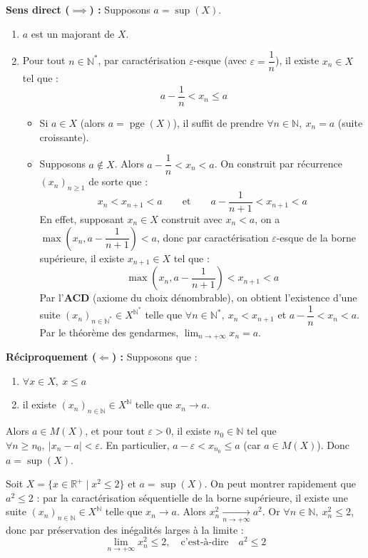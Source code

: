 \documentclass[a4paper,11pt]{article}
\newcommand{\R}{\mathbb{R}}
\newcommand{\N}{\mathbb{N}}
\DeclareMathOperator{\pge}{pge}
\newcommand{\mot}[1]{\textcolor{bordeaux}{\textbf{#1}}}
\begin{document}
\begin{demonstration}
\textbf{Sens direct ($\implies$) :} Supposons $a = \sup(X)$.
\begin{enumerate}
    \item $a$ est un majorant de $X$.
    \item Pour tout $n \in \N^*$, par caractérisation $\varepsilon$-esque (avec $\varepsilon = \dfrac{1}{n}$), il existe $x_n \in X$ tel que :
    \[
    a - \frac{1}{n} < x_n \le a
    \]
    \begin{itemize}
        \item Si $a \in X$ (alors $a = \pge(X)$), il suffit de prendre $\forall n \in \N, \ x_n = a$ (suite croissante).
        \item Supposons $a \notin X$. Alors $a - \dfrac{1}{n} < x_n < a$. On construit par récurrence $(x_n)_{n \ge 1}$ de sorte que :
        \[
        x_n < x_{n+1} < a \qquad \text{et} \qquad a - \frac{1}{n+1} < x_{n+1} < a
        \]
        En effet, supposant $x_n \in X$ construit avec $x_n < a$, on a $\max\left(x_n, a - \dfrac{1}{n+1}\right) < a$, donc par caractérisation $\varepsilon$-esque de la borne supérieure, il existe $x_{n+1} \in X$ tel que :
        \[
        \max\left(x_n, a - \frac{1}{n+1}\right) < x_{n+1} < a
        \]
        Par l'\mot{ACD} (axiome du choix dénombrable), on obtient l'existence d'une suite $(x_n)_{n \in \N^*} \in X^{\N^*}$ telle que $\forall n \in \N^*, \ x_n < x_{n+1}$ et $a - \dfrac{1}{n} < x_n < a$. Par le théorème des gendarmes, $\displaystyle\lim_{n \to +\infty} x_n = a$.
    \end{itemize}
\end{enumerate}

\textbf{Réciproquement ($\Longleftarrow$) :} Supposons que :
\begin{enumerate}
    \item $\forall x \in X, \ x \le a$
    \item il existe $(x_n)_{n \in \N} \in X^{\N}$ telle que $x_n \to a$.
\end{enumerate}
Alors $a \in M(X)$, et pour tout $\varepsilon > 0$, il existe $n_0 \in \N$ tel que $\forall n \ge n_0, \ |x_n - a| < \varepsilon$. En particulier, $a - \varepsilon < x_{n_0} \le a$ (car $a \in M(X)$). Donc $a = \sup(X)$.
\end{demonstration}

\begin{exemples}
Soit $X = \{ x \in \R^+ \mid x^2 \le 2 \}$ et $a = \sup(X)$. On peut montrer rapidement que $a^2 \le 2$ : par la caractérisation séquentielle de la borne supérieure, il existe une suite $(x_n)_{n \in \N} \in X^{\N}$ telle que $x_n \to a$. Alors $x_n^2 \xrightarrow[n \to +\infty]{} a^2$. Or $\forall n \in \N, \ x_n^2 \le 2$, donc par préservation des inégalités larges à la limite :
\[
\lim_{n \to +\infty} x_n^2 \le 2, \quad \text{c'est-à-dire} \quad a^2 \le 2
\]
\end{exemples}
\end{document}
